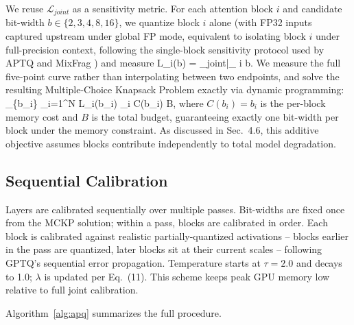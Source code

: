 \documentclass[10pt,twocolumn,letterpaper]{article}
\let\oldequation\equation
\let\oldendequation\endequation
\renewenvironment{equation}{\oldequation\small}{\oldendequation}
\begin{document}
We reuse $\mathcal{L}_{joint}$ as a sensitivity metric. For each attention block $i$ and candidate bit-width $b \in \{2,3,4,8,16\}$, we quantize block $i$ alone (with FP32 inputs captured upstream under global FP mode, equivalent to isolating block $i$ under full-precision context, following the single-block sensitivity protocol used by APTQ \cite{guan2024aptq} and MixFrag \cite{mixfrag2025}) and measure
\begin{equation}
L_i(b) = _{joint}\big|_{ i  b}.
\end{equation}
We measure the full five-point curve rather than interpolating between two endpoints, and solve the resulting Multiple-Choice Knapsack Problem exactly via dynamic programming:
\begin{equation}
\min_{\{b_i\}} \sum_{i=1}^{N} L_i(b_i) \quad {} \quad \sum_i C(b_i) \leq B,
\end{equation}
where $C(b_i)=b_i$ is the per-block memory cost and $B$ is the total budget, guaranteeing exactly one bit-width per block under the memory constraint. As discussed in Sec.~4.6, this additive objective assumes blocks contribute independently to total model degradation.

\subsection{Sequential Calibration}

Layers are calibrated sequentially over multiple passes. Bit-widths are fixed once from the MCKP solution; within a pass, blocks are calibrated in order. Each block is calibrated against realistic partially-quantized activations -- blocks earlier in the pass are quantized, later blocks sit at their current scales -- following GPTQ's sequential error propagation. Temperature starts at $\tau=2.0$ and decays to 1.0; $\lambda$ is updated per Eq.~(11). This scheme keeps peak GPU memory low relative to full joint calibration.

Algorithm~\ref{alg:apq} summarizes the full procedure.
\end{document}

